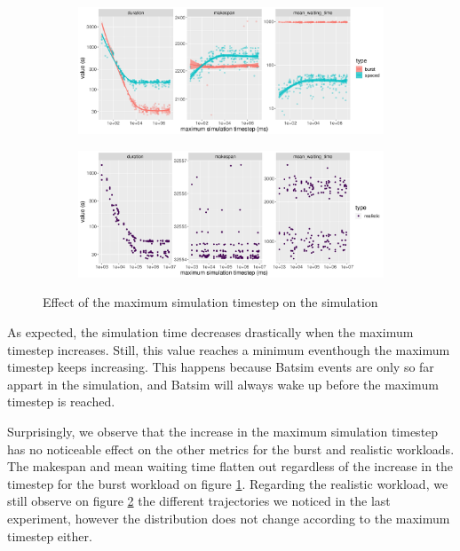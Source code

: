 \begin{figure}
	\begin{subfigure}{\textwidth}
		\centering
		\includegraphics[width=\textwidth]{imgs/max-timestep_burst_sp.png}
		\caption{}
		\label{fig:timestep_burst_sp}
	\end{subfigure}

	\begin{subfigure}{\textwidth}
		\centering
		\includegraphics[width=\textwidth]{imgs/max-timestep_realistic.png}
		\caption{}
		\label{fig:timestep_real}
	\end{subfigure}

	\caption{Effect of the maximum simulation timestep on the simulation}
	\label{fig:timestep}
\end{figure}


As expected, the simulation time decreases drastically when the maximum
timestep increases. Still, this value reaches a minimum eventhough the maximum
timestep keeps increasing. This happens because Batsim events are only so far
appart in the simulation, and Batsim will always wake up before the maximum
timestep is reached.

Surprisingly, we observe that the increase in the maximum simulation timestep
has no noticeable effect on the other metrics for the burst and realistic
workloads. The makespan and mean waiting time flatten out regardless of the
increase in the timestep for the burst workload on figure
\ref{fig:timestep_burst_sp}. Regarding the realistic workload, we still observe
on figure \ref{fig:timestep_real} the different trajectories we noticed in the
last experiment, however the distribution does not change according to the
maximum timestep either.

